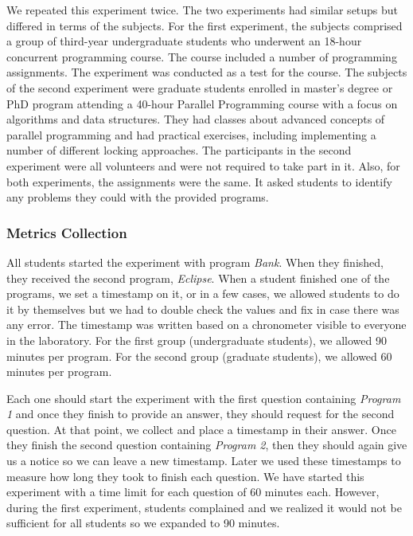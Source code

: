 We repeated this experiment twice.
The two experiments had similar setups but differed in terms of the subjects.
For the first experiment, the subjects comprised a group of third-year undergraduate students who underwent an 18-hour concurrent programming course.
The course included a number of programming assignments.
The experiment was conducted as a test for the course. The subjects of the second experiment were graduate students enrolled in master's degree or PhD program attending a 40-hour Parallel Programming course with a focus on algorithms and data structures.
They had classes about advanced concepts of parallel programming and had practical exercises, including implementing a number of different locking approaches.
The participants in the second experiment were all volunteers and were not required to take part in it.
Also, for both experiments, the assignments were the same.
It asked students to identify any problems they could with the provided programs.

\subsubsection{Metrics Collection}

All students started the experiment with program \emph{Bank}.
When they finished, they received the second program, \emph{Eclipse}.
When a student finished one of the programs, we set a timestamp on it, or in a few cases, we allowed students to do it by themselves but we had to double check the values and fix in case there was any error.
The timestamp was written based on a chronometer visible to everyone in the laboratory.
For the first group (undergraduate students), we allowed 90 minutes per program.
For the second group (graduate students), we allowed 60 minutes per program. 

Each one should start the experiment with the first question containing \emph{Program 1} and once they finish to provide an answer,
they should request for the second question.
At that point, we collect and place a timestamp in their answer.
Once they finish the second question containing \emph{Program 2},
then they should again give us a notice so we can leave a new timestamp.
Later we used these timestamps to measure how long they took to finish each question.
We have started this experiment with a time limit for each question of 60 minutes each.
However, during the first experiment, students complained and we realized it would not be sufficient for all students so we expanded to 90 minutes.

